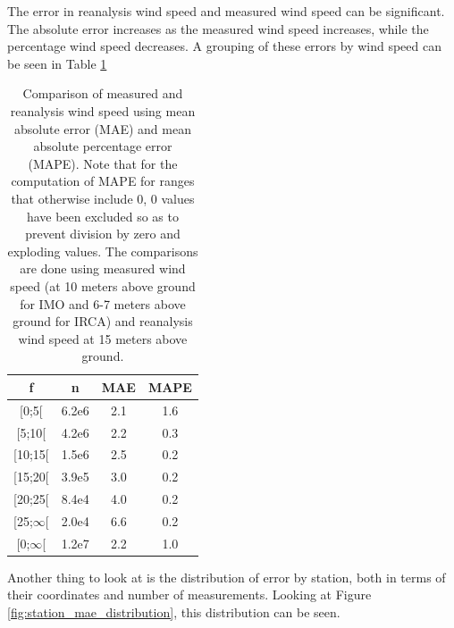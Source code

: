 The error in reanalysis wind speed and measured wind speed can be significant. The absolute error increases as the measured wind speed increases, while the percentage wind speed decreases. A grouping of these errors by wind speed can be seen in Table \ref{table:measuredVSReanalysis_wind_speed}


\begin{table}[h]
    \caption[Comparison of measured and reanalysis wind speed]{Comparison of measured and reanalysis wind speed using mean absolute error (MAE) and mean absolute percentage error (MAPE). Note that for the computation of MAPE for ranges that otherwise include 0, 0 values have been excluded so as to prevent division by zero and exploding values. The comparisons are done using measured wind speed (at 10 meters above ground for IMO and 6-7 meters above ground for IRCA) and reanalysis wind speed at 15 meters above ground.}
    \label{table:measuredVSReanalysis_wind_speed}
    \centering
    \begin{tabular}{c|ccc}
        f & n & MAE & MAPE \\ \hline
        {[}0;5{[} & 6.2e6 & 2.1 & 1.6\\
        {[}5;10{[} & 4.2e6 & 2.2 & 0.3\\
        {[}10;15{[} & 1.5e6 & 2.5 & 0.2\\
        {[}15;20{[} & 3.9e5 & 3.0 & 0.2\\
        {[}20;25{[} & 8.4e4 & 4.0 & 0.2\\
        {[}25;$\infty${[} & 2.0e4 & 6.6 & 0.2\\
        {[}0;$\infty${[} & 1.2e7 & 2.2 & 1.0
    \end{tabular}
\end{table}

Another thing to look at is the distribution of error by station, both in terms of their coordinates and number of measurements. Looking at Figure \ref{fig:station_mae_distribution}, this distribution can be seen.

